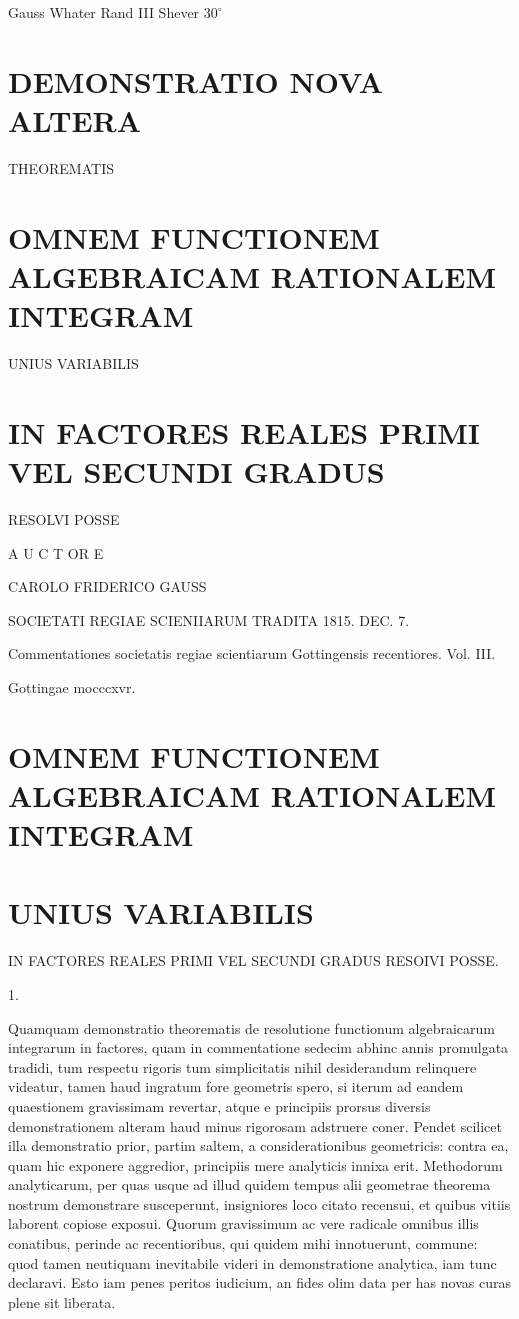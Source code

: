 \documentclass[twoside,12pt, showframe]{memoir}
\begin{document}
Gauss Whater Rand III Shever \(30^{\circ}\)

\section*{DEMONSTRATIO NOVA ALTERA}
THEOREMATIS

\section*{OMNEM FUNCTIONEM ALGEBRAICAM RATIONALEM INTEGRAM}
UNIUS VARIABILIS

\section*{IN FACTORES REALES PRIMI VEL SECUNDI GRADUS}
RESOLVI POSSE

A U C T OR E

CAROLO FRIDERICO GAUSS

SOCIETATI REGIAE SCIENIIARUM TRADITA 1815. DEC. 7.

Commentationes societatis regiae scientiarum Gottingensis recentiores. Vol. III.

Gottingae mocccxvr.

\section*{OMNEM FUNCTIONEM ALGEBRAICAM RATIONALEM INTEGRAM}
\section*{UNIUS VARIABILIS}
IN FACTORES REALES PRIMI VEL SECUNDI GRADUS RESOIVI POSSE.

1.

Quamquam demonstratio theorematis de resolutione functionum algebraicarum integrarum in factores, quam in commentatione sedecim abhinc annis promulgata tradidi, tum respectu rigoris tum simplicitatis nihil desiderandum relinquere videatur, tamen haud ingratum fore geometris spero, si iterum ad eandem quaestionem gravissimam revertar, atque e principiis prorsus diversis demonstrationem alteram haud minus rigorosam adstruere coner. Pendet scilicet illa demonstratio prior, partim saltem, a considerationibus geometricis: contra ea, quam hic exponere aggredior, principiis mere analyticis innixa erit. Methodorum analyticarum, per quas usque ad illud quidem tempus alii geometrae theorema nostrum demonstrare susceperunt, insigniores loco citato recensui, et quibus vitiis laborent copiose exposui. Quorum gravissimum ac vere radicale omnibus illis conatibus, perinde ac recentioribus, qui quidem mihi innotuerunt, commune: quod tamen neutiquam inevitabile videri in demonstratione analytica, iam tunc declaravi. Esto iam penes peritos iudicium, an fides olim data per has novas curas plene sit liberata.
\end{document}
